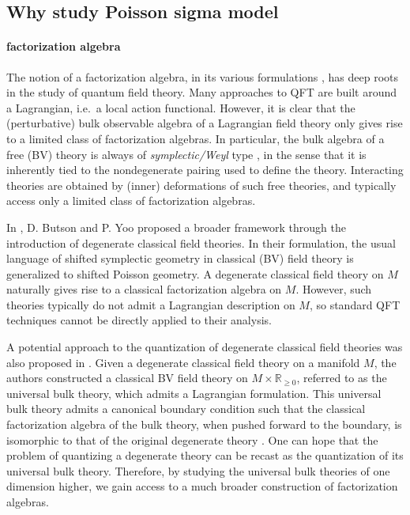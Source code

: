 \documentclass[11pt]{article}
\newcommand{\R}{\mathbb{R}}
\numberwithin{equation}{section}
\begin{document}
	\subsection{Why study Poisson sigma model}
	\paragraph{factorization algebra}
The notion of a factorization algebra, in its various formulations \cite{costello2017factorization,costello2021factorization,beilinson2025chiral,may2006geometry,lurie2017higher}, has deep roots in the study of quantum field theory. Many approaches to QFT are built around a Lagrangian, i.e.\ a local action functional. However, it is clear that the (perturbative) bulk observable algebra of a Lagrangian field theory only gives rise to a limited class of factorization algebras. In particular, the bulk algebra of a free (BV) theory is always of \emph{symplectic/Weyl} type \cite{gwilliam2012fac,Gaiotto:2024gii}, in the sense that it is inherently tied to the nondegenerate pairing used to define the theory. Interacting theories are obtained by (inner) deformations of such free theories, and typically access only a limited class of factorization algebras.

In \cite{butson2016degenerate}, D. Butson and P. Yoo proposed a broader framework through the introduction of degenerate classical field theories. In their formulation, the usual language of shifted symplectic geometry in classical (BV) field theory is generalized to shifted Poisson geometry. A degenerate classical field theory on $M$ naturally gives rise to a classical factorization algebra on $M$. However, such theories typically do not admit a Lagrangian description on $M$, so standard QFT techniques cannot be directly applied to their analysis.

A potential approach to the quantization of degenerate classical field theories was also proposed in \cite{butson2016degenerate}. Given a degenerate classical field theory on a manifold $M$, the authors constructed a classical BV field theory on $M \times \R_{\geq 0}$, referred to as the universal bulk theory, which admits a Lagrangian formulation. This universal bulk theory admits a canonical boundary condition such that the classical factorization algebra of the bulk theory, when pushed forward to the boundary, is isomorphic to that of the original degenerate theory \cite{rabinovich2022classical}. One can hope that the problem of quantizing a degenerate theory can be recast as the quantization of its universal bulk theory. Therefore, by studying the universal bulk theories of one dimension higher, we gain access to a much broader construction of factorization algebras.
\end{document}
